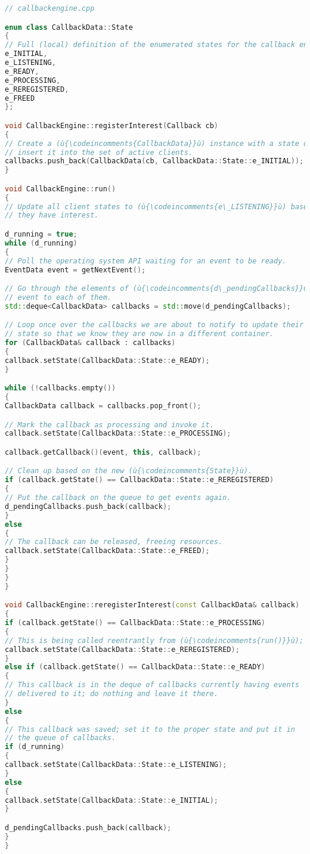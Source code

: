 \begin{lstlisting}[language=C++]
// callbackengine.cpp

enum class CallbackData::State
{
// Full (local) definition of the enumerated states for the callback engine.
e_INITIAL,
e_LISTENING,
e_READY,
e_PROCESSING,
e_REREGISTERED,
e_FREED
};

void CallbackEngine::registerInterest(Callback cb)
{
// Create a (ù{\codeincomments{CallbackData}}ù) instance with a state of (ù{\codeincomments{e\_INITIAL}}ù) and
// insert it into the set of active clients.
callbacks.push_back(CallbackData(cb, CallbackData::State::e_INITIAL));
}

void CallbackEngine::run()
{
// Update all client states to (ù{\codeincomments{e\_LISTENING}}ù) based on the events in which
// they have interest.

d_running = true;
while (d_running)
{
// Poll the operating system API waiting for an event to be ready.
EventData event = getNextEvent();

// Go through the elements of (ù{\codeincomments{d\_pendingCallbacks}}ù) to deliver this
// event to each of them.
std::deque<CallbackData> callbacks = std::move(d_pendingCallbacks);

// Loop once over the callbacks we are about to notify to update their
// state so that we know they are now in a different container.
for (CallbackData& callback : callbacks)
{
callback.setState(CallbackData::State::e_READY);
}

while (!callbacks.empty())
{
CallbackData callback = callbacks.pop_front();

// Mark the callback as processing and invoke it.
callback.setState(CallbackData::State::e_PROCESSING);

callback.getCallback()(event, this, callback);

// Clean up based on the new (ù{\codeincomments{State}}ù).
if (callback.getState() == CallbackData::State::e_REREGISTERED)
{
// Put the callback on the queue to get events again.
d_pendingCallbacks.push_back(callback);
}
else
{
// The callback can be released, freeing resources.
callback.setState(CallbackData::State::e_FREED);
}
}
}
}

void CallbackEngine::reregisterInterest(const CallbackData& callback)
{
if (callback.getState() == CallbackData::State::e_PROCESSING)
{
// This is being called reentrantly from (ù{\codeincomments{run()}}ù); simply update state.
callback.setState(CallbackData::State::e_REREGISTERED);
}
else if (callback.getState() == CallbackData::State::e_READY)
{
// This callback is in the deque of callbacks currently having events
// delivered to it; do nothing and leave it there.
}
else
{
// This callback was saved; set it to the proper state and put it in
// the queue of callbacks.
if (d_running)
{
callback.setState(CallbackData::State::e_LISTENING);
}
else
{
callback.setState(CallbackData::State::e_INITIAL);
}

d_pendingCallbacks.push_back(callback);
}
}

\end{lstlisting}

